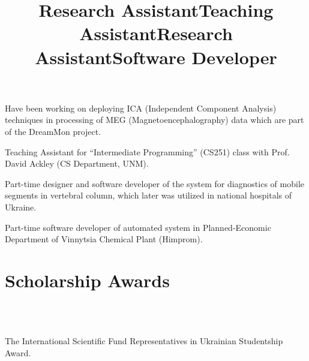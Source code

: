 \documentclass[10pt,overlapped,line]{res}
\begin{document}
\begin{resume}
 \title{Research Assistant}
 \begin{position}
   Have been working  on deploying ICA (Independent Component
   Analysis) techniques in processing of MEG (Magnetoencephalography)
   data which are part of the DreamMon project.


 \end{position}

 \title{Teaching Assistant}
 \begin{position}
   Teaching Assistant for ``Intermediate Programming'' (CS251) class
   with Prof. David Ackley (CS Department, UNM).
 \end{position}


 \title{Research Assistant}
 \begin{position}
 Part-time designer and software developer of the system for
 diagnostics of mobile segments in vertebral column, which later was
 utilized in national hospitals of Ukraine.
 \end{position}

 \title{Software Developer}
 \begin{position}
 Part-time software developer of automated system in
 Planned-Economic Department of Vinnytsia Chemical Plant (Himprom).
 \end{position}

 \section{Scholarship Awards}
 \begin{format}
   \\
   \body\\
 \end{format}

 \employer{}
 \begin{position}
  The International Scientific Fund Representatives in Ukrainian Studentship Award.
 \end{position}


\end{resume}
\end{document}
